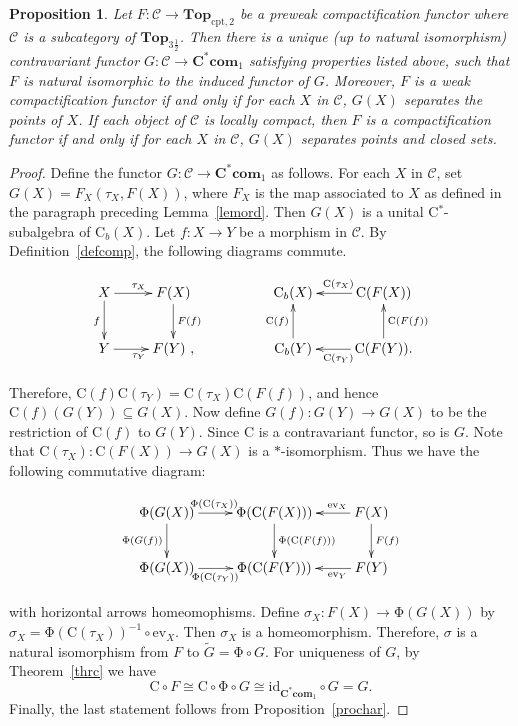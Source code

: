 \documentclass[manuscript]{amsart}
\newtheorem{proposition}[theorem]{Proposition}
\theoremstyle{definition}
\begin{document}
\begin{proposition}\label{propredu}
Let $F: \mathcal{C}\to  \mathbf{Top}_{\mathrm{cpt,2}}$ be a preweak
compactification functor where
$\mathcal{C}$ is a subcategory of  $\mathbf{Top}_{3\frac{1}{2}}$.
Then there is a unique (up to natural isomorphism)  contravariant functor
$G:\mathcal{C}\to \mathbf{C^{*}com}_{1}$ satisfying properties listed above, such that
$F$ is natural isomorphic to the induced functor of $G$.
Moreover, $F$ is a weak compactification functor
if and only if for each $X$ in $\mathcal{C}$,  $G(X)$ separates the points of $X$.
If each object of $\mathcal{C}$ is locally compact, then
$F$ is a  compactification functor
if and only if for each $X$ in $\mathcal{C}$,  $G(X)$
separates  points and closed sets.
\end{proposition}
\begin{proof}
Define the functor $G:\mathcal{C}\to \mathbf{C^{*}com}_{1}$ as follows.
For each $X$ in $\mathcal{C}$, set $G(X)=F_{X}(\tau_{X},F(X))$, where $F_{X}$ is the
map associated to $X$ as defined in the paragraph preceding Lemma~\ref{lemord}.
 Then
$G(X)$ is a unital C$^{*}$-subalgebra of $\mathrm{C}_{b}(X)$.
Let $f:X\to Y$ be a morphism in $\mathcal{C}$.
By Definition~\ref{defcomp}, the following diagrams commute.

\[
\xymatrix{
X \ar[d]_{f}\ar[r]^{\tau_{X}} & F(X) \ar[d]^{F(f)} \\
Y\ar[r]_{\tau_{Y}}  & F(Y)\ ,
}
\ \ \ \  \   \ \ \ \ \ \ \
\xymatrix{
\mathrm{C}_{b}(X)
& \mathrm{C}(F(X))  \ar[l]_{\mathrm{C}(\tau_{X})}  \\
\mathrm{C}_{b}(Y)\ar[u]^{\mathrm{C}(f)}
& \mathrm{C}(F(Y)) \ar[u]_{\mathrm{C}(F(f))} \ar[l]^{\mathrm{C}(\tau_{Y})} .
}
\]

Therefore,
$\mathrm{C}(f)\mathrm{C}(\tau_{Y})=
\mathrm{C}(\tau_{X})\mathrm{C}(F(f))$, and hence
$\mathrm{C}(f)(G(Y))\subseteq G(X)$.
Now define $G(f):G(Y)\to G(X)$ to be the restriction of
$\mathrm{C}(f)$ to $G(Y)$. Since $\mathrm{C}$ is a contravariant functor, so is $G$.
Note that $\mathrm{C}(\tau_{X}): \mathrm{C}(F(X))\to G(X)$ is a $*$-isomorphism.
Thus we have the following commutative diagram:

\[
\xymatrix{
\mathrm{\Phi}(G(X))\ar[d]_{\mathrm{\Phi}(G(f))}
\ar[r]^(.44){\mathrm{\Phi}(\mathrm{C}(\tau_{X}))} &
\mathrm{\Phi}(\mathrm{C}(F(X)))
\ar[d]^{\mathrm{\Phi}(\mathrm{C}(F(f)))} &
F(X)\ar[l]_(.35){\mathrm{ev}_{X}}\ar[d] ^{F(f)}
\\
\mathrm{\Phi}(G(X)) \ar[r]_(.45){\mathrm{\Phi}(\mathrm{C}(\tau_{Y}))}&
\mathrm{\Phi}(\mathrm{C}(F(Y))) &
F(Y)\ar[l]^(.35){\mathrm{ev}_{Y}}
}
\]

\noindent
with horizontal arrows homeomophisms. Define
 $\sigma_{X}:F(X)\to \mathrm{\Phi}(G(X))$ by
 $\sigma_{X}=\mathrm{\Phi}(\mathrm{C}(\tau_{X}))^{-1}\circ \mathrm{ev}_{X}$.
 Then $\sigma_{X}$ is a homeomorphism. Therefore,
 $\sigma$ is a natural isomorphism from $F$ to $\widetilde{G}= \mathrm{\Phi}\circ G$.
For uniqueness of $G$, by Theorem~\ref{thrc} we have
\[
\mathrm{C}\circ F\cong \mathrm{C} \circ \mathrm{\Phi}\circ G\cong
\mathrm{id}_{\mathbf{C^{*}com}_{1}} \circ G=G.
\]
Finally, the last statement follows from Proposition~\ref{prochar}.
\end{proof}
\end{document}
